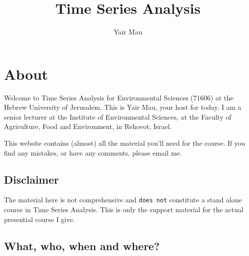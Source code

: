 \documentclass[
  letterpaper,
  DIV=11,
  numbers=noendperiod,
  oneside]{scrreprt}
\title{Time Series Analysis}
\author{Yair Mau}
\date{}
\renewcommand*\contentsname{Table of contents}
\newcommand\contentsname{Table of contents}
\begin{document}
\maketitle
\ifdefined\Shaded\renewenvironment{Shaded}{\begin{tcolorbox}[frame hidden, breakable, borderline west={3pt}{0pt}{shadecolor}, sharp corners, interior hidden, boxrule=0pt, enhanced]}{\end{tcolorbox}}\fi

\renewcommand*\contentsname{Table of contents}
{
\hypersetup{linkcolor=}
\setcounter{tocdepth}{2}
\tableofcontents
}

\hypertarget{about}{%
\chapter*{About}\label{about}}


Welcome to Time Series Analysis for Environmental Sciences (71606) at
the Hebrew University of Jerusalem. This is Yair Mau, your host for
today. I am a senior lecturer at the Institute of Environmental
Sciences, at the Faculty of Agriculture, Food and Environment, in
Rehovot, Israel.

This website contains (almost) all the material you'll need for the
course. If you find any mistakes, or have any comments, please email me.

\hypertarget{disclaimer}{%
\section*{Disclaimer}\label{disclaimer}}


The material here is not comprehensive and \texttt{does\ not} constitute
a stand alone course in Time Series Analysis. This is only the support
material for the actual presential course I give.

\hypertarget{what-who-when-and-where}{%
\section*{What, who, when and where?}\label{what-who-when-and-where}}

\end{document}
